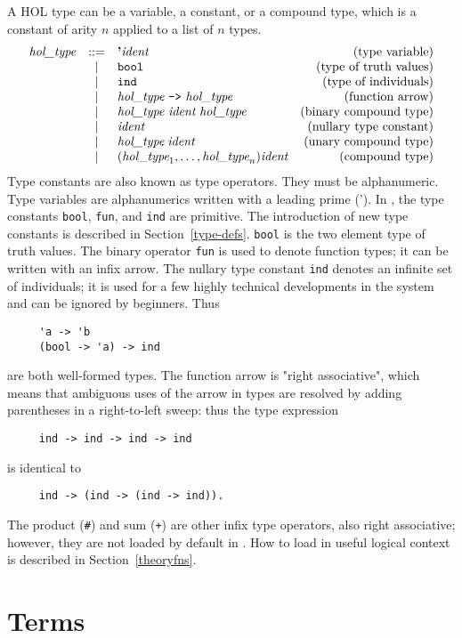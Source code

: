 {A HOL type can be a variable, a constant, or a compound type, which is
a constant of arity $n$ applied to a list of $n$ types.
\[
\begin{array}{rclr}
  \type & ::= & \mbox{\bf '}\ident & \mbox{(type variable)} \\
  & | &  \verb+bool+ & \mbox{(type of truth values)} \\
  & | &  \verb+ind+ & \mbox{(type of individuals)} \\
  & | &  \type\ \verb+->+\ \type & \mbox{(function arrow)} \\
  & | &  \type\ \ident\ \type\ & \mbox{(binary compound type)}\\
  & | &  \ident & \mbox{(nullary type constant)} \\
  & | & \type\; \ident & \mbox{(unary compound type)} \\
  & | & (\type_1,\ldots,\type_n) \ident & \mbox{(compound type)}
\end{array}
\]
Type constants are also known as type operators. They must be
alphanumeric. Type variables are alphanumerics written with a leading
prime ('). In \HOL{}, the type constants {\tt bool}, {\tt fun}, and
{\tt ind} are primitive. The introduction of new type constants is
described in Section~\ref{type-defs}. {\tt bool} is the two element type
of truth values. The binary operator {\tt fun} is used to denote
function types; it can be written with an infix arrow. The nullary
type constant {\tt ind} denotes an infinite set of individuals; it is
used for a few highly technical developments in the system and can be
ignored by beginners.  Thus
\begin{verbatim}
     'a -> 'b
     (bool -> 'a) -> ind
\end{verbatim}
are both well-formed types. The function arrow is "right associative",
which means that ambiguous uses of the arrow in types are resolved by
adding parentheses in a right-to-left sweep: thus the type expression
\begin{verbatim}
     ind -> ind -> ind -> ind
\end{verbatim}
is identical to
\begin{verbatim}
     ind -> (ind -> (ind -> ind)).
\end{verbatim}
The product (\verb+#+) and sum (\verb!+!) are other infix type
operators, also right associative; however, they are not loaded by
default in \HOL{}. How to load in useful logical context is described
in Section~\ref{theoryfns}.

\section{Terms}

}

